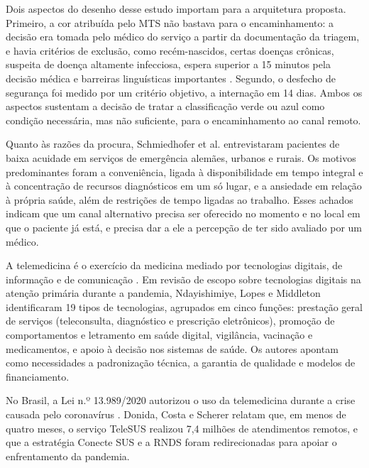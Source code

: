 Dois aspectos do desenho desse estudo importam para a arquitetura proposta. Primeiro, a cor atribuída pelo MTS não bastava para o encaminhamento: a decisão era tomada pelo médico do serviço a partir da documentação da triagem, e havia critérios de exclusão, como recém-nascidos, certas doenças crônicas, suspeita de doença altamente infecciosa, espera superior a 15 minutos pela decisão médica e barreiras linguísticas importantes \cite{sorznechay2025}. Segundo, o desfecho de segurança foi medido por um critério objetivo, a internação em 14 dias. Ambos os aspectos sustentam a decisão de tratar a classificação verde ou azul como condição necessária, mas não suficiente, para o encaminhamento ao canal remoto.

Quanto às razões da procura, Schmiedhofer et al. \cite{schmiedhofer2016} entrevistaram pacientes de baixa acuidade em serviços de emergência alemães, urbanos e rurais. Os motivos predominantes foram a conveniência, ligada à disponibilidade em tempo integral e à concentração de recursos diagnósticos em um só lugar, e a ansiedade em relação à própria saúde, além de restrições de tempo ligadas ao trabalho. Esses achados indicam que um canal alternativo precisa ser oferecido no momento e no local em que o paciente já está, e precisa dar a ele a percepção de ter sido avaliado por um médico.


A telemedicina é o exercício da medicina mediado por tecnologias digitais, de informação e de comunicação \cite{cfm2314}. Em revisão de escopo sobre tecnologias digitais na atenção primária durante a pandemia, Ndayishimiye, Lopes e Middleton \cite{ndayishimiye2023} identificaram 19 tipos de tecnologias, agrupados em cinco funções: prestação geral de serviços (teleconsulta, diagnóstico e prescrição eletrônicos), promoção de comportamentos e letramento em saúde digital, vigilância, vacinação e medicamentos, e apoio à decisão nos sistemas de saúde. Os autores apontam como necessidades a padronização técnica, a garantia de qualidade e modelos de financiamento.

No Brasil, a Lei n.º 13.989/2020 autorizou o uso da telemedicina durante a crise causada pelo coronavírus \cite{lei13989}. Donida, Costa e Scherer \cite{donida2021} relatam que, em menos de quatro meses, o serviço TeleSUS realizou 7,4 milhões de atendimentos remotos, e que a estratégia Conecte SUS e a RNDS foram redirecionadas para apoiar o enfrentamento da pandemia.

